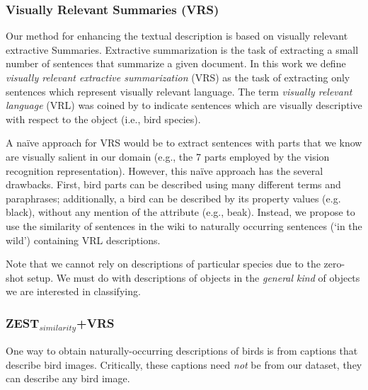 \documentclass[11pt,a4paper]{article}
\newcommand\gal[1]{\textcolor{bright}{\textbf{GAL:} #1 }}
\begin{document}
 
\subsubsection{Visually Relevant Summaries (VRS)}


Our method for enhancing the textual description is based on visually relevant extractive Summaries.
Extractive summarization is the task of extracting a small number of sentences that summarize a given document.
In this work we define {\em visually relevant extractive summarization} (VRS) as the task of extracting only sentences which represent {visually relevant} language. The term {\em visually relevant language} (VRL) was coined by \citet{winn2016detecting} to indicate sentences which are visually descriptive with respect to the object (i.e., bird species).


A {na\"{i}ve} approach for VRS would be to extract sentences with  parts that we know are visually salient in our domain (e.g., the 7 parts employed by the vision recognition representation).  However, this na\"{i}ve approach has the several drawbacks. First, bird parts can be described using many different terms and paraphrases; additionally, a bird can be described by its property values (e.g. black), without any mention of the  attribute (e.g.,  beak). 
Instead, we propose to use the similarity of sentences in the wiki to naturally occurring sentences  (`in the wild') containing VRL descriptions. %

Note that we cannot rely on descriptions of particular species due to the zero-shot setup. We must do with descriptions of objects in the  {\em  general kind} %
of objects we are interested in classifying. 

\subsubsection{ZEST$_{similarity}$+VRS}
One way to obtain naturally-occurring descriptions of birds is from captions that describe bird images. Critically, these captions need {\em not}  be from  our dataset, they can describe any bird image. 
\end{document}
